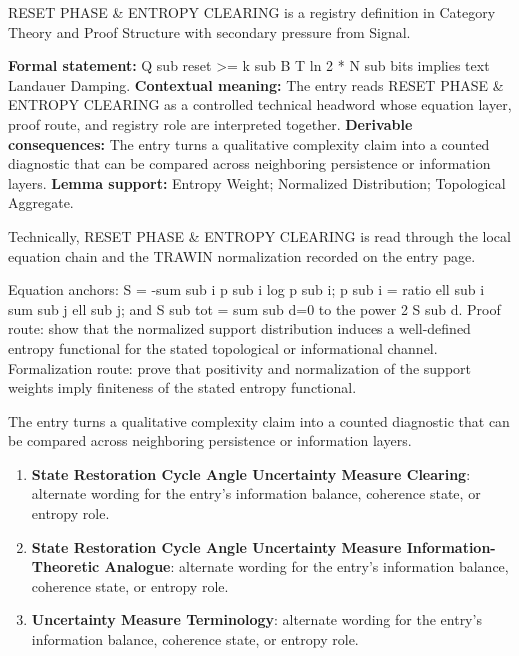 
\begingroup\small
{}
RESET PHASE \& ENTROPY CLEARING is a registry definition in Category Theory and Proof Structure with secondary pressure from Signal.

\begingroup\footnotesize\setlength{\emergencystretch}{3em}\sloppy
\textbf{Formal statement:} Q sub reset >= k sub B T ln 2 * N sub bits implies text Landauer Damping. \textbf{Contextual meaning:} The entry reads RESET PHASE \& ENTROPY CLEARING as a controlled technical headword whose equation layer, proof route, and registry role are interpreted together. \textbf{Derivable consequences:} The entry turns a qualitative complexity claim into a counted diagnostic that can be compared across neighboring persistence or information layers. \textbf{Lemma support:} Entropy Weight; Normalized Distribution; Topological Aggregate.\par
\endgroup

Technically, RESET PHASE \& ENTROPY CLEARING is read through the local equation chain and the TRAWIN normalization recorded on the entry page.

Equation anchors: S = -sum sub i p sub i log p sub i; p sub i = ratio ell sub i sum sub j ell sub j; and S sub tot = sum sub d=0 to the power 2 S sub d. Proof route: show that the normalized support distribution induces a well-defined entropy functional for the stated topological or informational channel. Formalization route: prove that positivity and normalization of the support weights imply finiteness of the stated entropy functional.

The entry turns a qualitative complexity claim into a counted diagnostic that can be compared across neighboring persistence or information layers.
\endgroup

\begin{enumerate}[leftmargin=1.6em,itemsep=6pt,topsep=4pt]
\item \textbf{State Restoration Cycle Angle Uncertainty Measure Clearing}: alternate wording for the entry's information balance, coherence state, or entropy role.
\item \textbf{State Restoration Cycle Angle Uncertainty Measure Information-Theoretic Analogue}: alternate wording for the entry's information balance, coherence state, or entropy role.
\item \textbf{Uncertainty Measure Terminology}: alternate wording for the entry's information balance, coherence state, or entropy role.
\end{enumerate}

